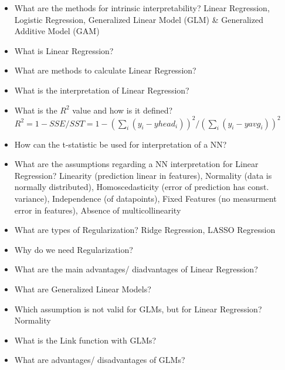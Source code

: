 \documentclass{report}
\begin{document}
	\begin{itemize}
	\item What are the methods for intrinsic interpretability?
	\newline Linear Regression, Logistic Regression, Generalized Linear Model (GLM) \& Generalized Additive Model (GAM)
	
	\item What is Linear Regression?
	\newline 
	\item What are methods to calculate Linear Regression?
	\newline 
	\item What is the interpretation of Linear Regression?
	\newline 
	\item What is the $R^2$ value and how is it defined?
	\newline $R^2 = 1 - SSE/SST = 1 - (\sum_{i} (y_i - yhead_i))^2/(\sum_i (y_i - yavg_i))^2$
	\item How can the t-statistic be used for interpretation of a NN?
	\newline 
	\item What are the assumptions regarding a NN interpretation for Linear Regression?
	\newline Linearity (prediction linear in features), Normality (data is normally distributed), Homoscedasticity (error of prediction has const. variance), Independence (of datapoints), Fixed Features (no measurment error in features), Absence of multicollinearity
	\item What are types of Regularization?
	\newline Ridge Regression, LASSO Regression
	\item Why do we need Regularization?
	\newline 
	\item What are the main advantages/ diadvantages of Linear Regression?
	\newline 
	
	\item What are Generalized Linear Models?
	\newline 
	\item Which assumption is not valid for GLMs, but for Linear Regression?
	\newline Normality
	\item What is the Link function with GLMs?
	\newline 
	\item What are advantages/ disadvantages of GLMs?
	\newline 
	

\end{itemize}
\end{document}
